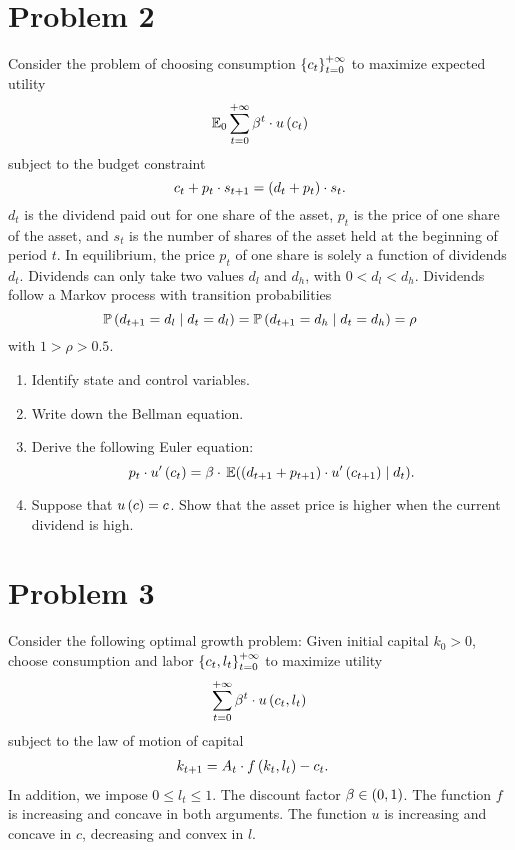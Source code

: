 \documentclass[letterpaper,12pt,leqno]{article}
\begin{document}
\section*{Problem 2}

Consider the problem of choosing consumption $\left\lbrace c_{t} \right\rbrace_{t=0}^{+\infty}$ to maximize expected utility
\begin{equation*}
\E_{0}\sum_{t=0}^{+\infty}\b^{t}\cdot u\bp{c_{t}}
\end{equation*}
subject to the budget constraint
\begin{equation*}
c_{t}+p_{t}\cdot s_{t+1}=\left( d_{t}+p_{t} \right)\cdot s_{t}.
\end{equation*}
$d_{t}$ is the dividend paid out for one share of the asset, $p_{t}$ is the price of one share of the asset, and $s_{t}$ is the number of shares of the asset held at the beginning of period $t$. In equilibrium, the price $p_{t}$ of one share is solely a function of dividends $d_{t}$. Dividends can only take two values $d_{l}$ and $d_{h}$, with $0<d_{l}<d_{h}$. Dividends follow a Markov process with transition probabilities 
\begin{equation*}
\P\bp{d_{t+1}=d_{l}\mid d_{t}=d_{l}} =\P \bp{d_{t+1}=d_{h}\mid d_{t}=d_{h}} =\rho
\end{equation*}
with $1>\rho >0.5.$

\begin{enumerate}
\item Identify state and control variables. 
\item Write down the Bellman equation.
\item Derive the following Euler equation: 
\begin{equation*}
p_{t}\cdot u'\bp{c_{t}} =\b\cdot  \E{\bp{d_{t+1}+p_{t+1}} \cdot u'\bp{c_{t+1}} \mid d_{t}} .
\end{equation*}

\item Suppose that $u\left( c \right) =c$. Show that the asset price is higher when the current dividend is high.
\end{enumerate}

\section*{Problem 3}

Consider the following optimal growth problem: Given initial capital $k_{0}>0$, choose consumption and labor $\left\lbrace c_{t},l_{t} \right\rbrace_{t=0}^{+\infty}$ to maximize utility
\begin{equation*}
\sum_{t=0}^{+\infty}\beta^{t}\cdot u\left( c_{t},l_{t} \right)
\end{equation*}
subject to the law of motion of capital
\begin{align*}
k_{t+1}&=A_{t}\cdot f\left( k_{t},l_{t} \right) -c_{t}.
\end{align*}
In addition, we impose $0\leq l_{t}\leq 1$. The discount factor $\beta \in \left( 0,1 \right) $. The function $f$ is increasing and concave in both arguments. The function $u$ is increasing and concave in $c$, decreasing and convex in $l$. 
\end{document}
